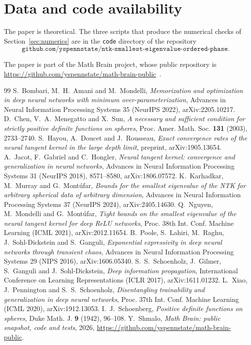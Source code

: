 \documentclass[11pt]{amsart}
\theoremstyle{remark}\newtheorem{remark}[theorem]{Remark}
\begin{document}
\section*{Data and code availability}

The paper is theoretical. The three scripts that produce the numerical checks of Section~\ref{sec:numerics} are in the \texttt{code} directory of the repository
\[
\texttt{github.com/yspennstate/ntk-smallest-eigenvalue-ordered-phase}.
\]

The paper is part of the Math Brain project, whose public repository is \url{https://github.com/yspennstate/math-brain-public}~\cite{MathBrainRepo}.

\begin{thebibliography}{99}
 S.~Bombari, M.~H.~Amani and M.~Mondelli, \emph{Memorization and optimization in deep neural networks
with minimum over-parameterization}, Advances in Neural Information Processing Systems 35 (NeurIPS 2022),
arXiv:2205.10217.
 D.~Chen, V.~A.~Menegatto and X.~Sun, \emph{A necessary and sufficient condition for strictly positive
definite functions on spheres}, Proc. Amer. Math. Soc. \textbf{131} (2003), 2733--2740.
 S.~Hayou, A.~Doucet and J.~Rousseau, \emph{Exact convergence rates of the neural tangent kernel in the
large depth limit}, preprint, arXiv:1905.13654.
 A.~Jacot, F.~Gabriel and C.~Hongler, \emph{Neural tangent kernel: convergence and generalization in neural
networks}, Advances in Neural Information Processing Systems 31 (NeurIPS 2018), 8571--8580, arXiv:1806.07572.
 K.~Karhadkar, M.~Murray and G.~Mont\'ufar, \emph{Bounds for the smallest eigenvalue of the NTK for
arbitrary spherical data of arbitrary dimension}, Advances in Neural Information Processing Systems 37 (NeurIPS 2024),
arXiv:2405.14630.
 Q.~Nguyen, M.~Mondelli and G.~Mont\'ufar, \emph{Tight bounds on the smallest eigenvalue of the neural
tangent kernel for deep ReLU networks}, Proc. 38th Int. Conf. Machine Learning (ICML 2021), arXiv:2012.11654.
 B.~Poole, S.~Lahiri, M.~Raghu, J.~Sohl-Dickstein and S.~Ganguli, \emph{Exponential expressivity in deep
neural networks through transient chaos}, Advances in Neural Information Processing Systems 29 (NIPS 2016),
arXiv:1606.05340.
 S.~S.~Schoenholz, J.~Gilmer, S.~Ganguli and J.~Sohl-Dickstein, \emph{Deep information propagation},
International Conference on Learning Representations (ICLR 2017), arXiv:1611.01232.
 L.~Xiao, J.~Pennington and S.~S.~Schoenholz, \emph{Disentangling trainability and generalization in deep
neural networks}, Proc. 37th Int. Conf. Machine Learning (ICML 2020), arXiv:1912.13053.
 I.~J.~Schoenberg, \emph{Positive definite functions on spheres}, Duke Math. J. \textbf{9} (1942),
96--108.
 Y.~Shmalo, \emph{Math Brain: public snapshot, code and tests}, 2026, \url{https://github.com/yspennstate/math-brain-public}.


\end{thebibliography}
\end{document}
